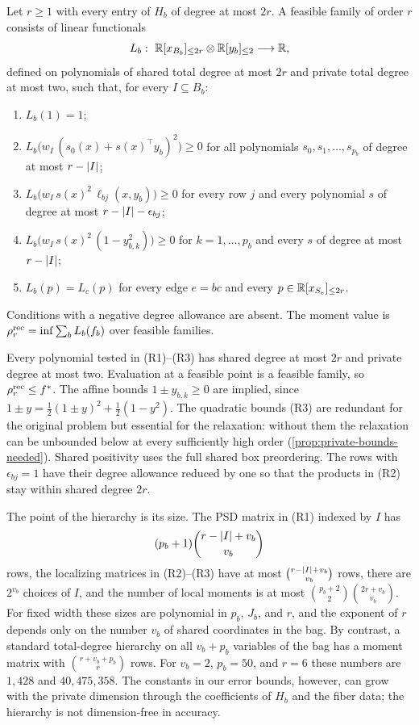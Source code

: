 \begin{definition}\label{def:rec-hierarchy}
Let $r\ge1$ with every entry of $H_b$ of degree at most $2r$. A feasible
family of order $r$ consists of linear functionals
\[
  L_b:\ \Rle{x_{B_b}}{2r}\otimes\Rle{y_b}{2}\longrightarrow\R,
\]
defined on polynomials of shared total degree at most $2r$ and private total
degree at most two, such that, for every $I\subseteq B_b$:
\begin{enumerate}[label=(R\arabic*),start=0]
\item $L_b(1)=1$;
\item $L_b\bigl(w_I\,(s_0(x)+s(x)^{\top}y_b)^2\bigr)\ge0$ for all
  polynomials $s_0,s_1,\dots,s_{p_b}$ of degree at most $r-\lvert I\rvert$;
\item $L_b\bigl(w_I\,s(x)^2\,\ell_{bj}(x,y_b)\bigr)\ge0$ for every row $j$
  and every polynomial $s$ of degree at most $r-\lvert I\rvert-\epsilon_{bj}$;
\item $L_b\bigl(w_I\,s(x)^2\,(1-y_{b,k}^2)\bigr)\ge0$ for $k=1,\dots,p_b$
  and every $s$ of degree at most $r-\lvert I\rvert$;
\item $L_b(p)=L_c(p)$ for every edge $e=bc$ and every
  $p\in\mathbb{R}[x_{S_e}]_{\le 2r}$.
\end{enumerate}
Conditions with a negative degree allowance are absent. The moment value is
$\rho^{\mathrm{rec}}_r=\inf\sum_bL_b(f_b)$ over feasible families.
\end{definition}

Every polynomial tested in (R1)--(R3) has shared degree at most $2r$ and
private degree at most two. Evaluation at a feasible point is a feasible
family, so $\rho^{\mathrm{rec}}_r\le f^{*}$. The affine bounds $1\pm y_{b,k}\ge0$ are
implied, since
$1\pm y=\tfrac12(1\pm y)^2+\tfrac12(1-y^2)$. The quadratic bounds (R3) are
redundant for the original problem but essential for the relaxation:
without them the relaxation can be unbounded below at every sufficiently
high order (\cref{prop:private-bounds-needed}). Shared positivity uses the full shared
box preordering. The rows with $\epsilon_{bj}=1$ have their degree allowance
reduced by one so that the products in (R2) stay within shared degree $2r$.

The point of the hierarchy is its size. The PSD matrix in (R1) indexed by
$I$ has
\begin{equation}\label{eq:rec-size}
  (p_b+1)\binom{r-\lvert I\rvert+v_b}{v_b}
\end{equation}
rows, the localizing matrices in (R2)--(R3) have at most
$\binom{r-\lvert I\rvert+v_b}{v_b}$ rows, there are $2^{v_b}$ choices of $I$, and the
number of local moments is at most
$\binom{p_b+2}{2}\binom{2r+v_b}{v_b}$. For fixed width these sizes are
polynomial in $p_b$, $J_b$, and $r$, and the exponent of $r$ depends only on
the number $v_b$ of shared coordinates in the bag. By contrast, a standard
total-degree hierarchy on all $v_b+p_b$ variables of the bag has a moment
matrix with $\binom{r+v_b+p_b}{r}$ rows. For $v_b=2$, $p_b=50$, and $r=6$
these numbers are $1{,}428$ and $40{,}475{,}358$. The constants in our error
bounds, however, can grow with the private dimension through the
coefficients of $H_b$ and the fiber data; the hierarchy is not
dimension-free in accuracy.


